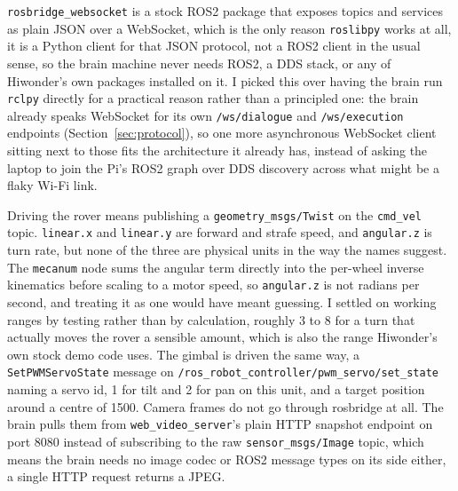 \texttt{rosbridge\_websocket} is a stock ROS2 package that exposes topics
and services as plain JSON over a WebSocket, which is the only reason
\texttt{roslibpy} works at all, it is a Python client for that JSON
protocol, not a ROS2 client in the usual sense, so the brain machine
never needs ROS2, a DDS stack, or any of Hiwonder's own packages
installed on it. I picked this over having the brain run \texttt{rclpy}
directly for a practical reason rather than a principled one: the brain
already speaks WebSocket for its own \texttt{/ws/dialogue} and
\texttt{/ws/execution} endpoints (Section~\ref{sec:protocol}), so one
more asynchronous WebSocket client sitting next to those fits the
architecture it already has, instead of asking the laptop to join the
Pi's ROS2 graph over DDS discovery across what might be a flaky Wi-Fi
link.

Driving the rover means publishing a \texttt{geometry\_msgs/Twist} on the
\texttt{cmd\_vel} topic. \texttt{linear.x} and \texttt{linear.y} are
forward and strafe speed, and \texttt{angular.z} is turn rate, but none
of the three are physical units in the way the names suggest. The
\texttt{mecanum} node sums the angular term directly into the per-wheel
inverse kinematics before scaling to a motor speed, so
\texttt{angular.z} is not radians per second, and treating it as one
would have meant guessing. I settled on working ranges by testing rather
than by calculation, roughly 3 to 8 for a turn that actually moves the
rover a sensible amount, which is also the range Hiwonder's own stock
demo code uses. The gimbal is driven the same way, a
\texttt{SetPWMServoState} message on
\texttt{/ros\_robot\_controller/pwm\_servo/set\_state} naming a servo id,
1 for tilt and 2 for pan on this unit, and a target position around a
centre of 1500. Camera frames do not go through rosbridge at all. The
brain pulls them from \texttt{web\_video\_server}'s plain HTTP snapshot
endpoint on port 8080 instead of subscribing to the raw
\texttt{sensor\_msgs/Image} topic, which means the brain needs no image
codec or ROS2 message types on its side either, a single HTTP request
returns a JPEG.

\label{sec:hw_lf}

